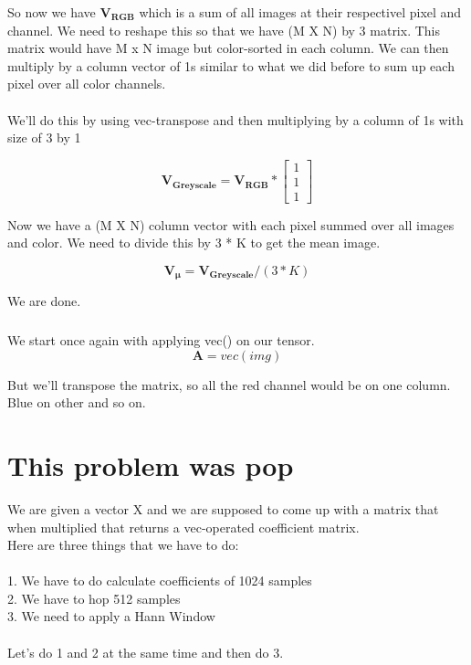 \documentclass{article}
\newcommand{\matr}[1]{\mathbf{#1}}
\begin{document}
		So now we have $\matr{V_{RGB}}$ which is a sum of all images at their respectivel pixel and channel. We need to reshape this so that
		we have (M X N) by 3 matrix. This matrix would have M x N image but color-sorted in each column.  
		We can then multiply by a column vector of 1s similar to what we did before to sum up each pixel over all color channels. \\
		\\
		We'll do this by using vec-transpose and then multiplying by a column of 1s with size of 3 by 1

		\begin{equation*}
		\matr{V_{Greyscale}} = \matr{V_{RGB}} * 
						\begin{bmatrix} 
						1 \\ 1 \\ 1  
						\end{bmatrix} 
		\end{equation*}	

		Now we have a (M X N) column vector with each pixel summed over all images and color. We need to divide this by 3 * K to get the mean
		image.

		\begin{equation*}
		\matr{V_{\mu}} = \matr{V_{Greyscale}} / (3*K) 
		\end{equation*}	

		We are done.

		\subsubsection{} %
	
		We start once again with applying vec() on our tensor.\\

		\begin{equation*}
		\matr{A} = vec(img)
		\end{equation*}
		
		But we'll transpose the matrix, so all the red channel would be on one column. Blue on other and so on. 
		
\section{This problem was pop}
	We are given a vector X and we are supposed to come up with a matrix that when multiplied that returns a vec-operated coefficient matrix.\\
	Here are three things that we have to do:\\
	\\
	1. We have to do calculate coefficients of 1024 samples\\
	2. We have to hop 512 samples\\
	3. We need to apply a Hann Window\\
	\\
	Let's do 1 and 2 at the same time and then do 3.
\end{document}
